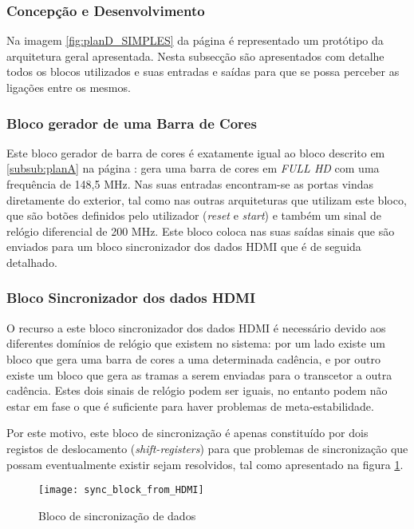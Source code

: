 \subsubsection{Concepção e Desenvolvimento}

Na imagem \ref{fig:planD_SIMPLES} da página \pageref{fig:planD_SIMPLES} é representado um protótipo da arquitetura geral apresentada. Nesta subsecção são apresentados com detalhe todos os blocos utilizados e suas entradas e saídas para que se possa perceber as ligações entre os mesmos. 

\subsubsection*{Bloco gerador de uma Barra de Cores} \label{subsub:serial_colorBarGenerator}

Este bloco gerador de barra de cores é exatamente igual ao bloco descrito em \ref{subsub:planA} na página \pageref{subsub:planA}: gera uma barra de cores em \textit{FULL HD} com uma frequência de 148,5 MHz. Nas suas entradas encontram-se as portas vindas diretamente do exterior, tal como nas outras arquiteturas que utilizam este bloco, que são botões definidos pelo utilizador (\textit{reset} e \textit{start}) e também um sinal de relógio diferencial de 200 MHz. Este bloco coloca nas suas saídas sinais que são enviados para um bloco sincronizador dos dados HDMI que é de seguida detalhado.

\subsubsection*{Bloco Sincronizador dos dados HDMI} \label{subsub:serial_syncsignals}

O recurso a este bloco sincronizador dos dados HDMI é necessário devido aos diferentes domínios de relógio que existem no sistema: por um lado existe um bloco que gera uma barra de cores a uma determinada cadência, e por outro existe um bloco que gera as tramas a serem enviadas para o transcetor a outra cadência. Estes dois sinais de relógio podem ser iguais, no entanto podem não estar em fase o que é suficiente para haver problemas de meta-estabilidade. 

Por este motivo, este bloco de sincronização é apenas constituído por dois registos de deslocamento (\textit{shift-registers}) para que problemas de sincronização que possam eventualmente existir sejam resolvidos, tal como apresentado na figura \ref{fig:sync_block}. 
\begin{figure}[h!]
	\begin{center}
		\leavevmode
		\texttt{[image: sync\_block\_from\_HDMI]}
		\captionsetup{width=1.0\linewidth}
		\caption[Bloco de sincronização de dados]{Bloco de sincronização de dados}
		\label{fig:sync_block}
	\end{center}
\end{figure}

